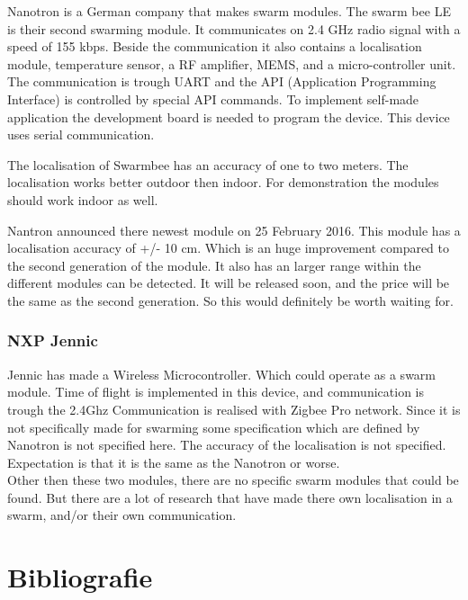 \documentclass[10pt,a4paper]{article}
\begin{document}
Nanotron is a German company that makes swarm modules. The swarm bee LE is their second swarming module. It communicates on 2.4 GHz radio signal with a speed of 155 kbps. Beside the communication it also contains a localisation module, temperature sensor, a RF amplifier, MEMS, and a micro-controller unit. The communication is trough UART and the API (Application Programming Interface) is controlled by special API commands. To implement self-made application the development board is needed to program the device. This device uses serial communication. 

The localisation of Swarmbee has an accuracy of one to two meters. The localisation works better outdoor then indoor. For demonstration the modules should work indoor as well. \cite{etotaal}

Nantron announced there newest module on 25 February 2016. This module has a localisation accuracy of +/- 10 cm. Which is an huge improvement compared to the second generation of the module. It also has an larger range within the different modules can be detected. It will be released soon, and the price will be the same as the second generation. So this would definitely be worth waiting for. \cite{nanotron}
	
\subsubsection{NXP Jennic} 

Jennic has made a Wireless Microcontroller. Which could operate as a swarm module. Time of flight is implemented in this device, and communication is trough the 2.4Ghz Communication is realised with Zigbee Pro network. Since it is not specifically made for swarming some specification which are defined by Nanotron is not specified here. The accuracy of the localisation is not specified. Expectation is that it is the same as the Nanotron or worse. \cite{wirelessmicrocontroller}\\

Other then these two modules, there are no specific swarm modules that could be found. But there are a lot of research that have made there own localisation in a swarm, and/or their own communication. 





\section{Bibliografie}


\end{document}
